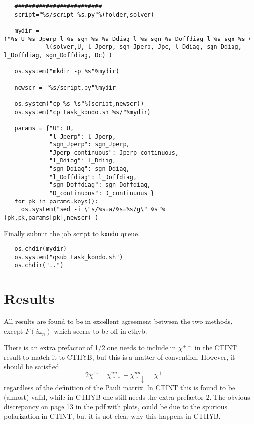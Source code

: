 \documentclass[a4paper,10pt]{article}
\newcommand{\up}{\uparrow}
\newcommand{\dn}{\downarrow}
\begin{document}
\begin{lstlisting}
   #########################    
   script="%s/script_%s.py"%(folder,solver)

   mydir = ("%s_U_%s_Jperp_l_%s_sgn_%s_%s_Ddiag_l_%s_sgn_%s_Doffdiag_l_%s_sgn_%s_%s"
            %(solver,U, l_Jperp, sgn_Jperp, Jpc, l_Ddiag, sgn_Ddiag, l_Doffdiag, sgn_Doffdiag, Dc) )

   os.system("mkdir -p %s"%mydir)

   newscr = "%s/script.py"%mydir 

   os.system("cp %s %s"%(script,newscr))
   os.system("cp task_kondo.sh %s/"%mydir)   

   params = {"U": U, 
             "l_Jperp": l_Jperp, 
             "sgn_Jperp": sgn_Jperp, 
             "Jperp_continuous": Jperp_continuous,
             "l_Ddiag": l_Ddiag,
             "sgn_Ddiag": sgn_Ddiag,
             "l_Doffdiag": l_Doffdiag,
             "sgn_Doffdiag": sgn_Doffdiag,
             "D_continuous": D_continuous }
   for pk in params.keys():  
     os.system("sed -i \"s/%s=a/%s=%s/g\" %s"%(pk,pk,params[pk],newscr) )

\end{lstlisting} 
Finally submit the job script to {\tt kondo} queue.
\begin{lstlisting}        
   os.chdir(mydir)
   os.system("qsub task_kondo.sh")
   os.chdir("..")
\end{lstlisting}

\section{Results}

All results are found to be in excellent agreement between the two methods, except $F(i\omega_n)$ which seems to be off in cthyb.

There is an extra prefactor of 1/2 one needs to include in $\chi^{+-}$ in the CTINT result to match it to CTHYB, but this is a matter of convention. However, it should be satisfied 
\begin{equation}
 2\chi^{zz} = \chi^{nn}_{\up\up} - \chi^{nn}_{\up\dn} = \chi^{+-}
\end{equation}
regardless of the definition of the Pauli matrix. In CTINT this is found to be (almost) valid, while in CTHYB one still needs the extra prefactor $2$. The obvious discrepancy on page 13 in the pdf with plots, could be due to the spurious polarization in CTINT, but it is not clear why this happens in CTHYB.
\end{document}
